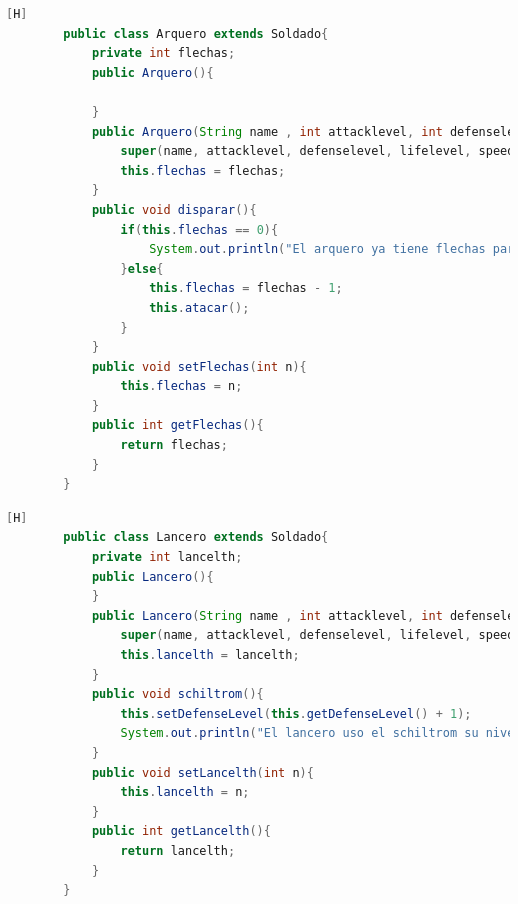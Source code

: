 \documentclass{article}
\begin{document}
	\begin{lstlisting}[language=java,caption={Las lineas de codigos de la clase Arquero creada:}][H]
		public class Arquero extends Soldado{
			private int flechas;
			public Arquero(){
				
			}
			public Arquero(String name , int attacklevel, int defenselevel, int lifelevel, int speed, String attitude ,boolean lives, int row, String column, int flechas){
				super(name, attacklevel, defenselevel, lifelevel, speed, attitude, lives, row, column);
				this.flechas = flechas;
			}
			public void disparar(){
				if(this.flechas == 0){
					System.out.println("El arquero ya tiene flechas para poder disparar");
				}else{
					this.flechas = flechas - 1;
					this.atacar();
				}
			}
			public void setFlechas(int n){
				this.flechas = n;
			}
			public int getFlechas(){
				return flechas;
			}
		}
	\end{lstlisting}
	\begin{lstlisting}[language=java,caption={Las lineas de codigos de la clase Lancero creada:}][H]
		public class Lancero extends Soldado{
			private int lancelth;
			public Lancero(){
			}
			public Lancero(String name , int attacklevel, int defenselevel, int lifelevel, int speed, String attitude ,boolean lives, int row, String column, int lancelth){
				super(name, attacklevel, defenselevel, lifelevel, speed, attitude, lives, row, column);
				this.lancelth = lancelth;
			}
			public void schiltrom(){
				this.setDefenseLevel(this.getDefenseLevel() + 1);
				System.out.println("El lancero uso el schiltrom su nivel de defensa subio 1 punto");
			}
			public void setLancelth(int n){
				this.lancelth = n;
			}
			public int getLancelth(){
				return lancelth;
			}
		}
	\end{lstlisting}
\end{document}
